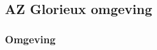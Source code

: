 \chapter{}
\label{ch:stand-van-zaken}




%
%
%

\section{AZ Glorieux omgeving}

\subsection{Omgeving}


